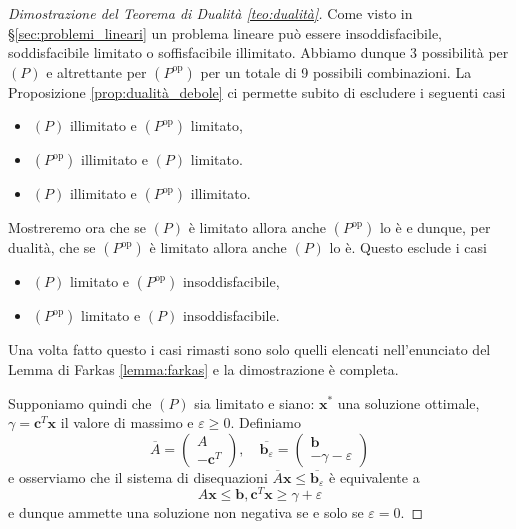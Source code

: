 \documentclass[italian, letter paper, 12pt, reqno]{article}
\theoremstyle{myteo}
\numberwithin{equation}{section}
\newcommand{\dual}[1]{#1^{\text{op}}}
\begin{document}
\begin{proof}[Dimostrazione del Teorema di Dualità \ref{teo:dualità}]
  Come visto in \S\ref{sec:problemi_lineari} un problema lineare può essere insoddisfacibile, soddisfacibile limitato o soffisfacibile illimitato.
  Abbiamo dunque 3 possibilità per \((P)\) e altrettante per \((\dual{P})\) per un totale di 9 possibili combinazioni.
  La Proposizione \ref{prop:dualità_debole} ci permette subito di escludere i seguenti casi
  \begin{itemize}
  \item \((P)\) illimitato e \((\dual{P})\) limitato,
  \item \((\dual{P})\) illimitato e \((P)\) limitato.
  \item \((P)\) illimitato e \((\dual{P})\) illimitato.
  \end{itemize}
  Mostreremo ora che se \((P)\) è limitato allora anche \((\dual{P})\) lo è e dunque, per dualità, che se \((\dual{P})\) è limitato allora anche \((P)\) lo è.
  Questo esclude i casi
  \begin{itemize}
  \item \((P)\) limitato e \((\dual{P})\) insoddisfacibile,
  \item \((\dual{P})\) limitato e \((P)\) insoddisfacibile.
  \end{itemize}
  Una volta fatto questo i casi rimasti sono solo quelli elencati nell'enunciato del Lemma di Farkas \ref{lemma:farkas} e la dimostrazione è completa.

  Supponiamo quindi che \((P)\) sia limitato e siano: \(\textbf{x}^*\) una soluzione ottimale, \(\gamma = \textbf{c}^T \textbf{x}\) il valore di massimo e \(\varepsilon \geq 0\).
  Definiamo
  \[\overline{A} =
    \begin{pmatrix}
      A\\
      -\textbf{c}^T
    \end{pmatrix},\quad \overline{\textbf{b}_\varepsilon} =
    \begin{pmatrix}
      \mathbf{b}\\
      -\gamma-\varepsilon
    \end{pmatrix}\]
  e osserviamo che il sistema di disequazioni \(\overline{A}\textbf{x} \leq \overline{\textbf{b}_\varepsilon}\) è equivalente a
  \[A \textbf{x} \leq \textbf{b}, \textbf{c}^T \textbf{x} \geq \gamma + \varepsilon\]
  e dunque ammette una soluzione non negativa se e solo se \(\varepsilon = 0\).


\end{proof}
\end{document}
